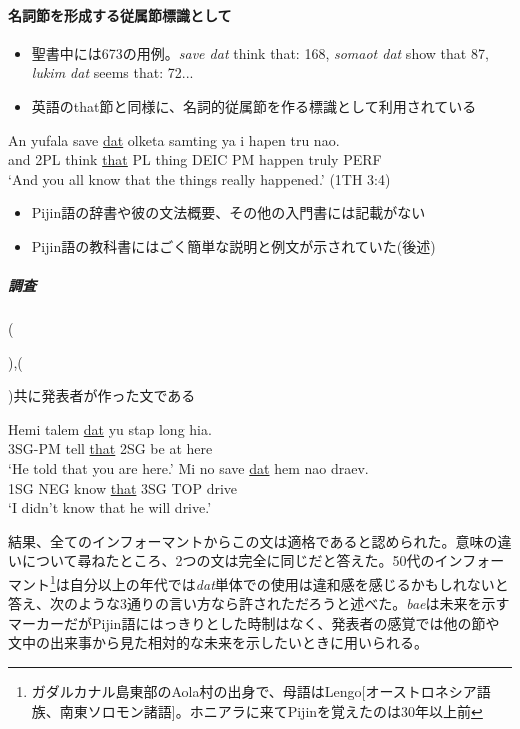 \documentclass[11pt,a4paper]{jsarticle}
\newcounter{tempcnt}
\newcommand{\exn}[1]{%
\setcounter{tempcnt}{\value{exx}}%
\addtocounter{tempcnt}{#1}%
\arabic{tempcnt}}
\begin{document}
\paragraph{名詞節を形成する従属節標識として}
\begin{itemize}
  \item 聖書中には673の用例。\textit{save dat} think that: 168, \textit{somaot dat} show that 87, \textit{lukim dat} seems that: 72...
  \item 英語のthat節と同様に、名詞的従属節を作る標識として利用されている
\end{itemize}
\begin{exe}
\ex
\gll An yufala save \underline{dat} olketa samting ya i hapen tru nao.\\
and 2PL think \underline{that} PL thing DEIC PM happen truly PERF\\
\glt `And you all know that the things really happened.' (1TH 3:4)
\end{exe}
\begin{itemize}
  \item Pijin語の辞書\cite{dictionary}や彼の文法概要\cite{syntax}、その他の入門書\cite{yumi}には記載がない
  \item Pijin語の教科書\cite{eric}にはごく簡単な説明と例文が示されていた(後述)
\end{itemize}
\subparagraph{調査}
(\exn{1}),(\exn{2})共に発表者が作った文である
\begin{exe}
\ex
\gll Hemi talem \underline{dat} yu stap long hia.\\
3SG-PM tell \underline{that} 2SG be at here\\
\glt `He told that you are here.'
\ex
\gll Mi no save \underline{dat} hem nao draev.\\
1SG NEG know \underline{that} 3SG TOP drive\\
\glt `I didn't know that he will drive.'
\end{exe}

結果、全てのインフォーマントからこの文は適格であると認められた。意味の違いについて尋ねたところ、2つの文は完全に同じだと答えた。50代のインフォーマント\footnote{ガダルカナル島東部のAola村の出身で、母語はLengo[オーストロネシア語族、南東ソロモン諸語]。ホニアラに来てPijinを覚えたのは30年以上前}は自分以上の年代では\textit{dat}単体での使用は違和感を感じるかもしれないと答え、次のような3通りの言い方なら許されただろうと述べた。\textit{bae}は未来を示すマーカーだがPijin語にはっきりとした時制はなく\citep{eric}、発表者の感覚では他の節や文中の出来事から見た相対的な未来を示したいときに用いられる。
\end{document}
